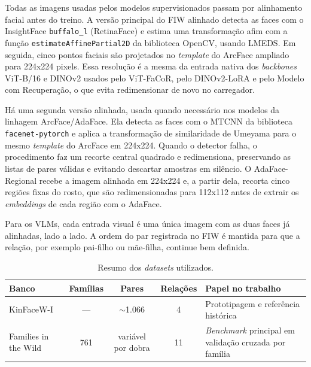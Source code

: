 Todas as imagens usadas pelos modelos supervisionados passam por alinhamento facial antes do treino. A versão principal do FIW alinhado detecta as faces com o InsightFace \texttt{buffalo\_l} (RetinaFace) e estima uma transformação afim com a função \texttt{estimateAffinePartial2D} da biblioteca OpenCV, usando LMEDS. Em seguida, cinco pontos faciais são projetados no \textit{template} do ArcFace ampliado para 224x224 pixels. Essa resolução é a mesma da entrada nativa dos \textit{backbones} ViT-B/16 e DINOv2 usados pelo ViT-FaCoR, pelo DINOv2-LoRA e pelo Modelo com Recuperação, o que evita redimensionar de novo no carregador.

Há uma segunda versão alinhada, usada quando necessário nos modelos da linhagem ArcFace/AdaFace. Ela detecta as faces com o MTCNN da biblioteca \texttt{facenet-pytorch} e aplica a transformação de similaridade de Umeyama para o mesmo \textit{template} do ArcFace em 224x224. Quando o detector falha, o procedimento faz um recorte central quadrado e redimensiona, preservando as listas de pares válidas e evitando descartar amostras em silêncio. O AdaFace-Regional recebe a imagem alinhada em 224x224 e, a partir dela, recorta cinco regiões fixas do rosto, que são redimensionadas para 112x112 antes de extrair os \textit{embeddings} de cada região com o AdaFace.

Para os VLMs, cada entrada visual é uma única imagem com as duas faces já alinhadas, lado a lado. A ordem do par registrada no FIW é mantida para que a relação, por exemplo pai-filho ou mãe-filha, continue bem definida.

\begin{table}[h]
\centering
\caption{Resumo dos \textit{datasets} utilizados.}
\label{tab:datasets}
\begin{tabularx}{\textwidth}{l c c c X}
\hline
\textbf{Banco} & \textbf{Famílias} & \textbf{Pares} & \textbf{Relações} & \textbf{Papel no trabalho} \\
\hline
KinFaceW-I & --- & $\sim$1.066 & 4 & Prototipagem e referência histórica \\
Families in the Wild & 761 & variável por dobra\footnotemark & 11 & \textit{Benchmark} principal em validação cruzada por família \\
\hline
\end{tabularx}
\end{table}

